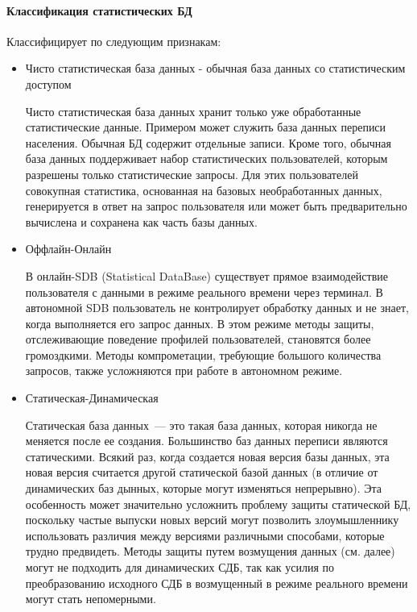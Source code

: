 \paragraph{Классификация статистических БД}
Классифицирует по следующим признакам:
\begin{itemize}

    \item Чисто статистическая база данных - обычная база данных со статистическим доступом

Чисто статистическая база данных хранит только уже обработанные статистические данные. Примером может служить база данных переписи населения.
Обычная БД содержит отдельные записи. Кроме того, обычная база данных поддерживает набор статистических пользователей, которым разрешены только статистические запросы. Для этих пользователей совокупная статистика, основанная на базовых необработанных данных, генерируется в ответ на запрос пользователя или может быть предварительно вычислена и сохранена как часть базы данных.

    \item Оффлайн-Онлайн

В онлайн-SDB (Statistical DataBase) существует прямое взаимодействие пользователя с данными в режиме реального времени через терминал. В автономной SDB пользователь не контролирует обработку данных и не знает, когда выполняется его запрос данных. В этом режиме методы защиты, отслеживающие поведение профилей пользователей, становятся более громоздкими. Методы компрометации, требующие большого количества запросов, также усложняются при работе в автономном режиме.

    \item Статическая-Динамическая

Статическая база данных~--- это такая база данных, которая никогда не меняется после ее создания. Большинство баз данных переписи являются статическими. Всякий раз, когда создается новая версия базы данных, эта новая версия считается другой статической базой данных (в отличие от динамических баз дынных, которые могут изменяться непрерывно). Эта особенность может значительно усложнить проблему защиты статической БД, поскольку частые выпуски новых версий могут позволить злоумышленнику использовать различия между версиями различными способами, которые трудно предвидеть. Методы защиты путем возмущения данных (см. далее) могут не подходить для динамических СДБ, так как усилия по преобразованию исходного СДБ в возмущенный в режиме реального времени могут стать непомерными.


\end{itemize}
